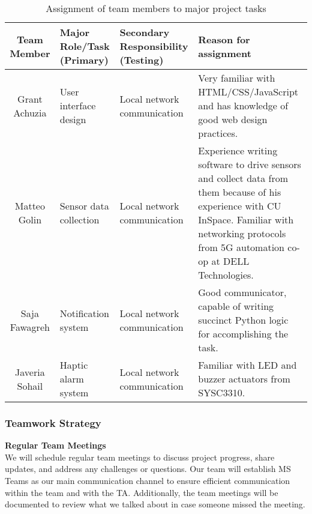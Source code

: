 \begin{table}[H]
    \centering
    \begin{tabular}{| c | p{3cm} | p{4cm} | p{5cm} |}
        \hline
        \textbf{Team Member} & \textbf{Major Role/Task (Primary)} & \textbf{Secondary Responsibility (Testing)} &
        \textbf{Reason for assignment}                                                                                                  \\
        \hline
        Grant Achuzia        & User interface design              & Local network communication                 & Very
        familiar with HTML/CSS/JavaScript and has knowledge of good web design practices.                                               \\
        \hline
        Matteo Golin         & Sensor data collection             & Local network communication                 &
        Experience writing software to drive sensors and collect data from them because of his experience with CU
        InSpace. Familiar with networking protocols from 5G automation co-op at DELL Technologies.                                      \\
        \hline
        Saja Fawagreh        & Notification system                & Local network communication                 &
        Good communicator, capable of writing succinct Python logic for accomplishing the task.                                         \\
        \hline
        Javeria Sohail       & Haptic alarm system                & Local network communication                 & Familiar with LED and
        buzzer actuators from SYSC3310.                                                                                                 \\
        \hline
    \end{tabular}
    \caption{Assignment of team members to major project tasks}
\end{table}

\subsubsection{Teamwork Strategy}

\textbf{Regular Team Meetings} \\
We will schedule regular team meetings to discuss project progress, share updates, and address any challenges or
questions. Our team will establish MS Teams as our main communication channel to ensure efficient communication within
the team and with the TA. Additionally, the team meetings will be documented to review what we talked about in case
someone missed the meeting.

